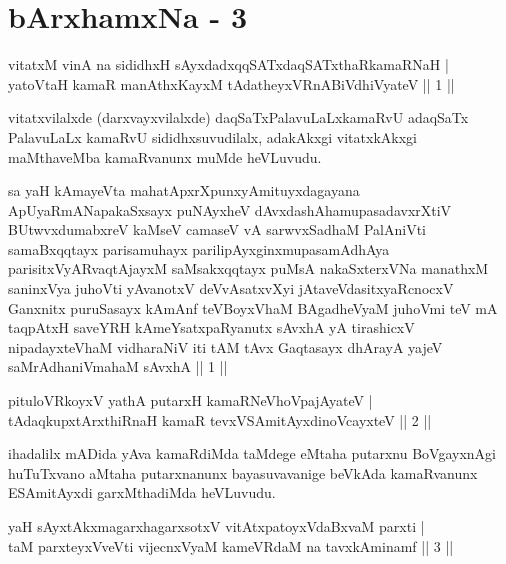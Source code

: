 \chapter{bArxhamxNa - 3}


\begin{shl}
vitatxM vinA na sididhxH sAyxdadxqqSATxdaqSATxthaRkamaRNaH | \\
yatoV\s taH kamaR manAthxKayxM tAdatheyxVRnABiVdhiVyateV \hfill|| 1 || 
\end{shl}

\begin{artha}
vitatxvilalxde (darxvayxvilalxde) daqSaTxPalavuLaLxkamaRvU adaqSaTx PalavuLaLx kamaRvU sididhxsuvudilalx, adakAkxgi vitatxkAkxgi maMthaveMba kamaRvanunx muMde heVLuvudu.
\end{artha}

\begin{kandikeshl}
sa yaH kAmayeVta mahatApxrXpunxyAmituyxdagayana ApUyaRmANapakaSxsayx puNAyxheV dAvxdashAhamupasadavxrXtiV BUtwvxdumabxreV kaMseV camaseV vA sarwvxSadhaM PalAniVti samaBxqqtayx parisamuhayx parilipAyxginxmupasamAdhAya parisitxVyARvaqtAjayxM saMsakxqqtayx puMsA nakaSxterxVNa manathxM saninxVya juhoVti yAvanotxV deVvAsatxvXyi jAtaveVdasitxyaRcnocxV Ganxnitx puruSasayx kAmAnf teVBoyxV\s haM BAgadheVyaM juhoVmi teV mA taqpAtxH saveYRH kAmeYsatxpaRyanutx sAvxhA yA tirashicxV nipadayxteV\s haM vidharaNiV iti tAM tAvx Gaqtasayx dhArayA yajeV saMrAdhaniVmahaM sAvxhA || 1 ||
\end{kandikeshl}


\begin{shl}
pituloVRkoyxV yathA putarxH kamaRNeVhoVpajAyateV | \\
tAdaqkupxtArxthiRnaH kamaR tevxVSAmitAyxdinoVcayxteV \hfill|| 2 || 
\end{shl}

\begin{artha}
ihadalilx mADida yAva kamaRdiMda taMdege eMtaha putarxnu BoVgayxnAgi huTuTxvano aMtaha putarxnanunx bayasuvavanige beVkAda kamaRvanunx ESAmitAyxdi garxMthadiMda heVLuvudu.
\end{artha}


\begin{shl}
yaH sAyxtAkxmagarxhagarxsotxV vitAtxpatoyxVdaBxvaM parxti | \\
taM parxteyxVveVti vijecnxVyaM kameVRdaM na tavxkAminamf \hfill|| 3 || 
\end{shl}

